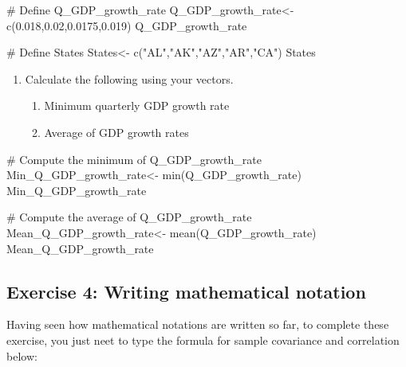 \documentclass[
  letterpaper,
  DIV=11,
  numbers=noendperiod]{scrartcl}
\newenvironment{Shaded}{\begin{snugshade}}{\end{snugshade}}
\newcommand{\CommentTok}[1]{\textcolor[rgb]{0.37,0.37,0.37}{#1}}
\newcommand{\FloatTok}[1]{\textcolor[rgb]{0.68,0.00,0.00}{#1}}
\newcommand{\FunctionTok}[1]{\textcolor[rgb]{0.28,0.35,0.67}{#1}}
\newcommand{\NormalTok}[1]{\textcolor[rgb]{0.00,0.23,0.31}{#1}}
\newcommand{\OtherTok}[1]{\textcolor[rgb]{0.00,0.23,0.31}{#1}}
\newcommand{\StringTok}[1]{\textcolor[rgb]{0.13,0.47,0.30}{#1}}
\providecommand{\tightlist}{%
  \setlength{\itemsep}{0pt}\setlength{\parskip}{0pt}}\usepackage{longtable,booktabs,array}
\begin{document}
\begin{Shaded}
\begin{Highlighting}[]
\CommentTok{\# Define Q\_GDP\_growth\_rate}
\NormalTok{Q\_GDP\_growth\_rate}\OtherTok{\textless{}{-}} \FunctionTok{c}\NormalTok{(}\FloatTok{0.018}\NormalTok{,}\FloatTok{0.02}\NormalTok{,}\FloatTok{0.0175}\NormalTok{,}\FloatTok{0.019}\NormalTok{)}
\NormalTok{Q\_GDP\_growth\_rate}

\CommentTok{\# Define States}
\NormalTok{States}\OtherTok{\textless{}{-}} \FunctionTok{c}\NormalTok{(}\StringTok{"AL"}\NormalTok{,}\StringTok{"AK"}\NormalTok{,}\StringTok{"AZ"}\NormalTok{,}\StringTok{"AR"}\NormalTok{,}\StringTok{"CA"}\NormalTok{)}
\NormalTok{States}
\end{Highlighting}
\end{Shaded}

\begin{enumerate}
\def\labelenumi{\arabic{enumi}.}
\setcounter{enumi}{1}
\tightlist
\item
  Calculate the following using your vectors.

  \begin{enumerate}
  \def\labelenumii{\alph{enumii}.}
  \tightlist
  \item
    Minimum quarterly GDP growth rate
  \item
    Average of GDP growth rates
  \end{enumerate}
\end{enumerate}

\begin{Shaded}
\begin{Highlighting}[]
\CommentTok{\# Compute the minimum of Q\_GDP\_growth\_rate}
\NormalTok{Min\_Q\_GDP\_growth\_rate}\OtherTok{\textless{}{-}} \FunctionTok{min}\NormalTok{(Q\_GDP\_growth\_rate)}
\NormalTok{Min\_Q\_GDP\_growth\_rate}

\CommentTok{\# Compute the average of Q\_GDP\_growth\_rate}
\NormalTok{Mean\_Q\_GDP\_growth\_rate}\OtherTok{\textless{}{-}} \FunctionTok{mean}\NormalTok{(Q\_GDP\_growth\_rate)}
\NormalTok{Mean\_Q\_GDP\_growth\_rate}
\end{Highlighting}
\end{Shaded}

\subsection{Exercise 4: Writing mathematical
notation}\label{exercise-4-writing-mathematical-notation}

Having seen how mathematical notations are written so far, to complete
these exercise, you just neet to type the formula for sample covariance
and correlation below:
\end{document}
